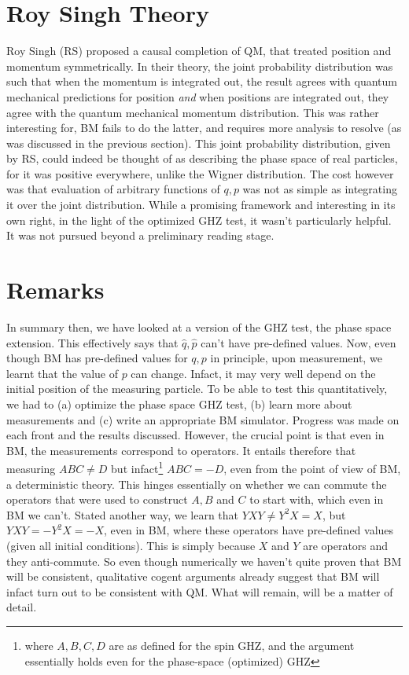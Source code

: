 \section{Roy Singh Theory }

Roy Singh (RS) proposed \cite{roySingh} a causal completion of QM,
that treated position and momentum symmetrically. In their theory,
the joint probability distribution was such that when the momentum
is integrated out, the result agrees with quantum mechanical predictions
for position \emph{and} when positions are integrated out, they agree
with the quantum mechanical momentum distribution. This was rather
interesting for, BM fails to do the latter, and requires more analysis
to resolve (as was discussed in the previous section). This joint
probability distribution, given by RS, could indeed be thought of
as describing the phase space of real particles, for it was positive
everywhere, unlike the Wigner distribution. The cost however was that
evaluation of arbitrary functions of $q,p$ was not as simple as integrating
it over the joint distribution. While a promising framework and interesting
in its own right, in the light of the optimized GHZ test, it wasn't
particularly helpful. It was not pursued beyond a preliminary reading
stage. 


\section{Remarks}

In summary then, we have looked at a version of the GHZ test, the
phase space extension. This effectively says that $\hat{q},\hat{p}$
can't have pre-defined values. Now, even though BM has pre-defined
values for $q,p$ in principle, upon measurement, we learnt that the
value of $p$ can change. Infact, it may very well depend on the initial
position of the measuring particle. To be able to test this quantitatively,
we had to (a) optimize the phase space GHZ test, (b) learn more about
measurements and (c) write an appropriate BM simulator. Progress was
made on each front and the results discussed. However, the crucial
point is that even in BM, the measurements correspond to operators.
It entails therefore that measuring $ABC\neq D$ but infact\footnote{where $A,B,C,D$ are as defined for the spin GHZ, and the argument
essentially holds even for the phase-space (optimized) GHZ} $ABC=-D$, even from the point of view of BM, a deterministic theory.
This hinges essentially on whether we can commute the operators that
were used to construct $A,B$ and $C$ to start with, which even in
BM we can't. Stated another way, we learn that $YXY\neq Y^{2}X=X$,
but $YXY=-Y^{2}X=-X$, even in BM, where these operators have pre-defined
values (given all initial conditions). This is simply because $X$
and $Y$ are operators and they anti-commute. So even though numerically
we haven't quite proven that BM will be consistent, qualitative cogent
arguments already suggest that BM will infact turn out to be consistent
with QM. What will remain, will be a matter of detail.

